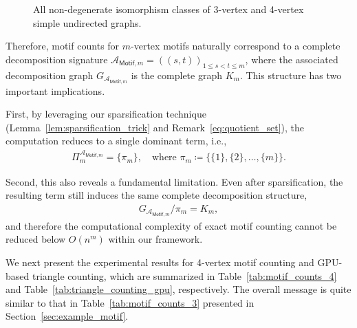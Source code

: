 \documentclass[12pt]{article}
\theoremstyle{plain}
\theoremstyle{definition}
\newcommand{\partition}{\Pi}
\newcommand{\completegraphp}[1]{K_{#1}}
\newcommand{\graphform}[1]{G_{#1}}
\newcommand{\less}{O}
\def\calA{\mathcal{A}}
\begin{document}
\begin{bibunit}[agsm]
\begin{figure}[ht]
    \caption{All non-degenerate isomorphism classes of 3-vertex and 4-vertex simple undirected graphs.}
    \label{fig:motif-3-4}
\end{figure}

Therefore, motif counts for $m$-vertex motifs naturally correspond to a complete decomposition signature $\calA_{\mathsf{Motif},m} = ((s,t))_{1 \le s < t \le m}$, where the associated decomposition graph $\graphform{\calA_{\mathsf{Motif},m}}$ is the complete graph $\completegraphp{m}$. 
This structure has two important implications. 

First, by leveraging our sparsification technique (Lemma~\ref{lem:sparsification_trick} and Remark~\ref{eq:quotient_set}), the computation reduces to a single dominant term, i.e.,
\begin{align*}
\partition_m^{\calA_{\mathsf{Motif},m}} 
= \{ \pi_m \}, 
\quad \text{where } 
\pi_m \coloneqq \big\{ \{1\}, \{2\}, \ldots, \{m\} \big\}.
\end{align*}

Second, this also reveals a fundamental limitation. 
Even after sparsification, the resulting term still induces the same complete decomposition structure,
\begin{align*}
\graphform{\calA_{\mathsf{Motif},m}} / \pi_m 
= \completegraphp{m},
\end{align*}
and therefore the computational complexity of exact motif counting cannot be reduced below $\less(n^m)$ within our framework.

We next present the experimental results for 4-vertex motif counting and GPU-based triangle counting, which are summarized in Table~\ref{tab:motif_counts_4} and Table~\ref{tab:triangle_counting_gpu}, respectively. The overall message is quite similar to that in Table~\ref{tab:motif_counts_3} presented in Section~\ref{sec:example_motif}.


\end{bibunit}
\end{document}
